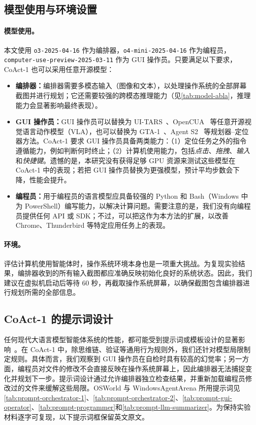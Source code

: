 \documentclass{article} %
\newcommand{\ours}{CoAct-1\xspace}
\begin{document}
\subsection{模型使用与环境设置}
\paragraph{模型使用。}
 本文使用 \texttt{o3-2025-04-16} 作为编排器，\texttt{o4-mini-2025-04-16} 作为编程员，\texttt{computer-use-preview-2025-03-11} 作为 GUI 操作员。只要满足以下要求，\ours 也可以采用任意开源模型：
\begin{itemize}[leftmargin=0.3cm, itemindent=0.3cm]
    \item \textbf{编排器：}编排器需要多模态输入（图像和文本），以处理操作系统的全部屏幕截图并进行规划；它还需要较强的跨模态推理能力（见\autoref{tab:model-abla}，推理能力会显著影响最终表现）。
    \item \textbf{GUI 操作员：}GUI 操作员可以替换为 UI-TARS~\citep{qin2025ui}、OpenCUA~\citep{wang2025opencua} 等任意开源视觉语言动作模型（VLA），也可以替换为 GTA-1~\citep{yang2025gta1guitesttimescaling}、Agent S2~\citep{agashe2025agent} 等规划器--定位器方法。\ours 要求 GUI 操作员具备两类能力：（1）定位任务之外的指令遵循能力，例如判断何时终止；（2）计算机使用能力，包括\textit{点击}、\textit{拖拽}、\textit{输入}和\textit{快捷键}。遗憾的是，本研究没有获得足够 GPU 资源来测试这些模型在 \ours 中的表现；若把 GUI 操作员替换为更强模型，预计平均步数会下降，性能会提升。
    \item \textbf{编程员：}用于编程员的语言模型应具备较强的 Python 和 Bash（Windows 中为 PowerShell）编写能力，以解决计算问题。需要注意的是，我们没有向编程员提供任何 API 或 SDK；不过，可以把这作为本方法的扩展，以改善 Chrome、Thunderbird 等特定应用任务上的表现。
\end{itemize}

\paragraph{环境。}
评估计算机使用智能体时，操作系统环境本身也是一项重大挑战。为复现实验结果，编排器收到的所有输入截图都应准确反映初始化良好的系统状态。因此，我们建议在虚拟机启动后等待 60 秒，再截取操作系统屏幕，以确保截图包含编排器进行规划所需的全部信息。

\subsection{\ours 的提示词设计}
任何现代大语言模型智能体系统的性能，都可能受到提示词或模板设计的显著影响~\citep{he2024doespromptformattingimpact}。在 \ours 中，除思维链、验证等通用行为规则外，我们还针对模型局限制定规则。具体而言，我们观察到 GUI 操作员在自检时具有较高的幻觉率；另一方面，编程员对文件的修改不会直接反映在操作系统屏幕上，因此编排器无法捕捉变化并规划下一步。提示词设计通过允许编排器独立检查结果，并重新加载编程员修改过的文件来缓解这些局限。OSWorld 与 WindowsAgentArena 所用提示词见\autoref{tab:prompt-orchestrator-1}、\autoref{tab:prompt-orchestrator-2}、\autoref{tab:prompt-gui-operator}、\autoref{tab:prompt-programmer}和\autoref{tab:prompt-llm-summarizer}。为保持实验材料逐字可复现，以下提示词框保留英文原文。
\end{document}

